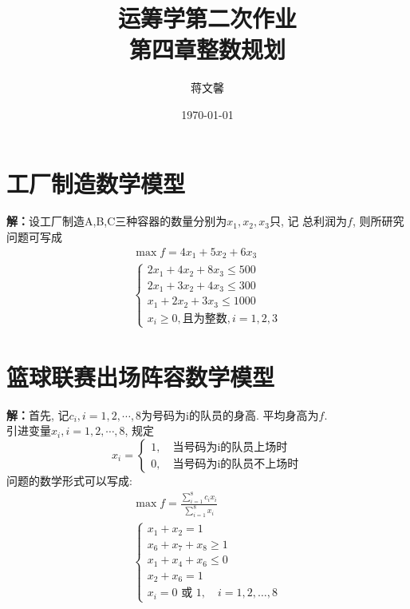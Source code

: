 \documentclass[11pt,AutoFakeBold]{article}
\title{运筹学第二次作业\\第四章\quad 整数规划}
\author{\normalsize 蒋文馨 \quad 16342067}
\date{\today}
\begin{document}
\maketitle
\renewcommand{\contentsname}{目录}
\tableofcontents


\section{工厂制造数学模型}
\textbf{解：}设工厂制造A,B,C三种容器的数量分别为$x_1,x_2,x_3$只, 记
总利润为$f$, 则所研究问题可写成
$$\begin{array}{l}
\max f=4 x_{1}+5 x_{2}+6 x_3 \\
\left\{\begin{array}{l}
2x_{1}+4x_{2}+8x_3 \leqslant 500 \\
2x_{1}+3x_{2}+4x_3 \leqslant 300 \\
x_{1}+2x_{2}+3x_3\leqslant 1000 \\
x_{i} \geqslant 0,\text {且为整数}, i=1,2,3
\end{array}\right.
\end{array}$$


\section{篮球联赛出场阵容数学模型}
\textbf{解：}首先, 记$c_i,i=1,2,\cdots,8$为号码为i的队员的身高. 
平均身高为$f$.\\
引进变量$x_i,i=1,2,\cdots,8$, 规定
$$x_i=\left\{\begin{array}{l}
        1,\quad \text{当号码为i的队员上场时}\\
        0,\quad \text{当号码为i的队员不上场时}
\end{array}\right.$$
问题的数学形式可以写成:
$$\begin{array}{l}
\max f=\frac{\sum_{i=1}^8 c_ix_i}{\sum_{i=1}^8 x_i} \\
\left\{\begin{array}{l}
x_{1}+x_{2}= 1 \\
x_{6}+x_{7}+x_8\geqslant 1 \\
x_{1}+x_4+x_6 \leqslant 0 \\
x_{2}+x_6 = 1 \\
x_{i} = 0\text{ 或 }1,\quad i=1,2,\dots,8
\end{array}\right.
\end{array}$$
\end{document}
